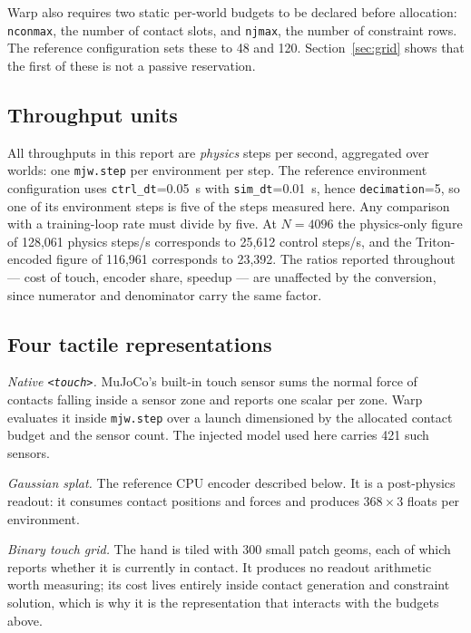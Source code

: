 \documentclass[journal]{IEEEtran}
\begin{document}
Warp also requires two static per-world budgets to be declared before allocation: \texttt{nconmax}, the number of contact slots, and \texttt{njmax}, the number of constraint rows. The reference configuration sets these to 48 and 120. Section~\ref{sec:grid} shows that the first of these is not a passive reservation.

\subsection{Throughput units}
\label{sec:units}

All throughputs in this report are \emph{physics} steps per second, aggregated over worlds: one \texttt{mjw.step} per environment per step. The reference environment configuration uses \texttt{ctrl\_dt}=0.05~s with \texttt{sim\_dt}=0.01~s, hence \texttt{decimation}=5, so one of its environment steps is five of the steps measured here. Any comparison with a training-loop rate must divide by five. At $N=4096$ the physics-only figure of 128,061 physics steps/s corresponds to 25,612 control steps/s, and the Triton-encoded figure of 116,961 corresponds to 23,392. The ratios reported throughout --- cost of touch, encoder share, speedup --- are unaffected by the conversion, since numerator and denominator carry the same factor.

\subsection{Four tactile representations}

\emph{Native \texttt{\textless touch\textgreater}.} MuJoCo's built-in touch sensor sums the normal force of contacts falling inside a sensor zone and reports one scalar per zone. Warp evaluates it inside \texttt{mjw.step} over a launch dimensioned by the allocated contact budget and the sensor count. The injected model used here carries 421 such sensors.

\emph{Gaussian splat.} The reference CPU encoder described below. It is a post-physics readout: it consumes contact positions and forces and produces $368\times3$ floats per environment.

\emph{Binary touch grid.} The hand is tiled with 300 small patch geoms, each of which reports whether it is currently in contact. It produces no readout arithmetic worth measuring; its cost lives entirely inside contact generation and constraint solution, which is why it is the representation that interacts with the budgets above.
\end{document}
